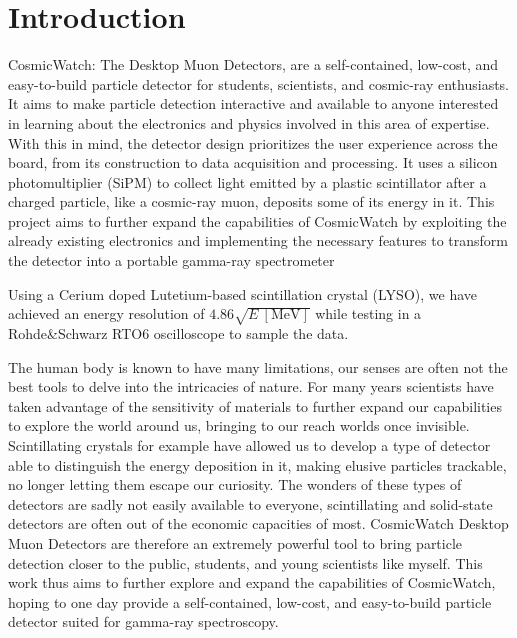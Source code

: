 \chapter{Introduction}

CosmicWatch: The Desktop Muon Detectors, are a self-contained, low-cost, and easy-to-build particle detector for students, scientists, and cosmic-ray enthusiasts. It aims to make particle detection interactive and available to anyone interested in learning about the electronics and physics involved in this area of expertise. With this in mind, the detector design prioritizes the user experience across the board, from its construction to data acquisition and processing. It uses a silicon photomultiplier (SiPM) to collect light emitted by a plastic scintillator after a charged particle, like a cosmic-ray muon, deposits some of its energy in it. This project aims to further expand the capabilities of CosmicWatch by exploiting the already existing electronics and implementing the necessary features to transform the detector into a portable gamma-ray spectrometer

Using a Cerium doped Lutetium-based scintillation crystal (LYSO), we have achieved an energy resolution of  $4.86 \sqrt{E~[\unit{\MeV}]}$ while testing in a Rohde\&Schwarz RTO6 oscilloscope to sample the data.

The human body is known to have many limitations, our senses are often not the best tools to delve into the intricacies of nature. For many years scientists have taken advantage of the sensitivity of materials to further expand our capabilities to explore the world around us, bringing to our reach worlds once invisible. Scintillating crystals for example have allowed us to develop a type of detector able to distinguish the energy deposition in it, making elusive particles trackable, no longer letting them escape our curiosity. The wonders of these types of detectors are sadly not easily available to everyone, scintillating and solid-state detectors are often out of the economic capacities of most. CosmicWatch Desktop Muon Detectors are therefore an extremely powerful tool to bring particle detection closer to the public, students, and young scientists like myself. This work thus aims to further explore and expand the capabilities of CosmicWatch, hoping to one day provide a self-contained, low-cost, and easy-to-build particle detector suited for gamma-ray spectroscopy.